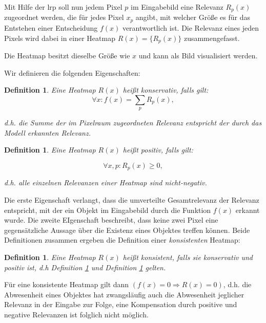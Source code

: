 \documentclass[twoside, 11pt,a4paper]{article}
\def\emph#1{\textit{#1}}
\newtheorem{definition}[theorem]{Definition}
\numberwithin{equation}{section}
\begin{document}
	Mit Hilfe der \gls{lrp} soll nun jedem Pixel $p$ im Eingabebild eine Relevanz $R_p(x)$ zugeordnet werden, die für jedes Pixel $x_p$ angibt, mit welcher Größe es für das Entstehen einer Entscheidung $f(x)$ verantwortlich ist. Die Relevanz eines jeden Pixels wird dabei in einer Heatmap $R(x) = \lbrace R_p(x) \rbrace$ zusammengefasst.
	
	Die Heatmap besitzt dieselbe Größe wie $x$ und kann als Bild visualisiert werden.
	
	Wir definieren die folgenden Eigenschaften:
	
	\begin{definition}\label{def_konservativ}
		Eine Heatmap $R(x)$ heißt \emph{konservativ}, falls gilt:
		\begin{equation}
		\forall x: f(x) = \sum_p R_p(x),
		\end{equation}
		
		d.h. die Summe der im Pixelraum zugeordneten Relevanz entspricht der durch das Modell erkannten Relevanz.
	\end{definition}
	
	
	\begin{definition} \label{def_pos}
		Eine Heatmap $R(x)$ heißt \emph{positiv}, falls gilt:
		
		\begin{equation}
		\forall x,p: R_p(x) \geq 0,
		\end{equation}
		
		d.h. alle einzelnen Relevanzen einer Heatmap sind nicht-negativ.
		
	\end{definition}
	
	Die erste Eigenschaft verlangt, dass die umverteilte Gesamtrelevanz der Relevanz entspricht, mit der ein Objekt im Eingabebild durch die Funktion $f(x)$ erkannt wurde.
	Die zweite EIgenschaft beschreibt, dass keine zwei Pixel eine gegensätzliche Aussage über die Existenz eines Objektes treffen können. Beide Definitionen zusammen ergeben die Definition einer \textit{konsistenten} Heatmap:
	
	\begin{definition}
		Eine Heatmap $R(x)$ heißt \emph{konsistent}, falls sie konservativ und positiv ist, d.h Definition \ref{def_konservativ} und Definition \ref{def_pos} gelten.
	\end{definition}
	
	Für eine konsistente Heatmap gilt dann $(f(x) = 0 \Rightarrow R(x) = 0)$, d.h. die Abwesenheit eines Objektes hat zwangsläufig auch die Abwesenheit jeglicher Relevanz in der Eingabe zur Folge, eine Kompensation durch positive und negative Relevanzen ist folglich nicht möglich.
	
\end{document}
